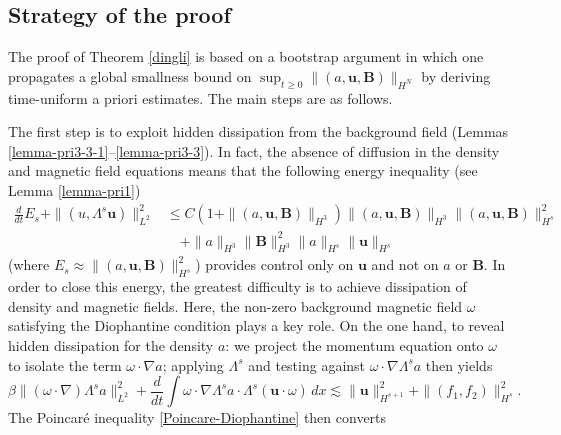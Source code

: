 \documentclass[12pt, reqno]{amsart}
\numberwithin{equation}{section}
\numberwithin{equation}{section}
\numberwithin{equation}{section}
\numberwithin{equation}{section}
\theoremstyle{remark}
\def\u{ \mathbf{u} }
\def\b{ \mathbf{B} }
\begin{document}
\subsection{Strategy of the proof}

The proof of Theorem \ref{dingli} is based on a bootstrap argument in
which one propagates a global smallness bound on
$\sup_{t\geq 0}\|(a,\mathbf{u},\b)\|_{H^N}$ by deriving
time-uniform a priori estimates.  The main steps are as follows.

\medskip
The first step is to exploit hidden dissipation from the background
	field (Lemmas \ref{lemma-pri3-3-1}--\ref{lemma-pri3-3}). In fact,
the absence of diffusion in the density and magnetic field equations
means that the following  energy inequality (see Lemma \ref{lemma-pri1})
\begin{equation}\begin{split}\label{2026-6-27-pri-2-2}
\frac{d}{dt}E_s+
\|(u,\Lambda^s\u)\|_{L^2}^2&\leq C(1+\|(a,\u,\b)\|_{H^3})\|(a,\u,\b)\|_{H^3}\|(a,\u,\b)\|^2_{H^s}\\&\quad+
\|a\|_{H^3}\|\b\|^{2}_{H^3}\|a\|_{H^s}\|\u\|_{H^s}
\end{split}\end{equation}
(where $E_s\approx\|(a,\u,\b)\|_{H^s}^2$) provides control only
on $\u$ and not on $a$ or $\b$. In order to close this energy, the greatest difficulty   is to achieve dissipation
of density and magnetic fields. Here,  the non-zero background magnetic field $\omega$ satisfying the Diophantine condition plays a key role.
On the one hand, to reveal hidden dissipation for the density $a$: we project the
momentum equation onto $\omega$ to isolate the term $\omega\cdot\nabla a$;
applying $\Lambda^s$ and testing against $\omega\cdot\nabla\Lambda^s a$
then yields
\begin{equation}\label{density-dissipation-sketch}
	\beta\|(\omega\cdot\nabla)\Lambda^s a\|_{L^2}^2
	+ \frac{d}{dt}\int\omega\cdot\nabla\Lambda^s a\cdot\Lambda^s(\mathbf{u}\cdot\omega)\,dx
	\lesssim \|\mathbf{u}\|_{H^{s+1}}^2 + \|(f_1,f_2)\|_{H^s}^2.
\end{equation}
The Poincar\'{e} inequality \eqref{Poincare-Diophantine} then converts
\end{document}
